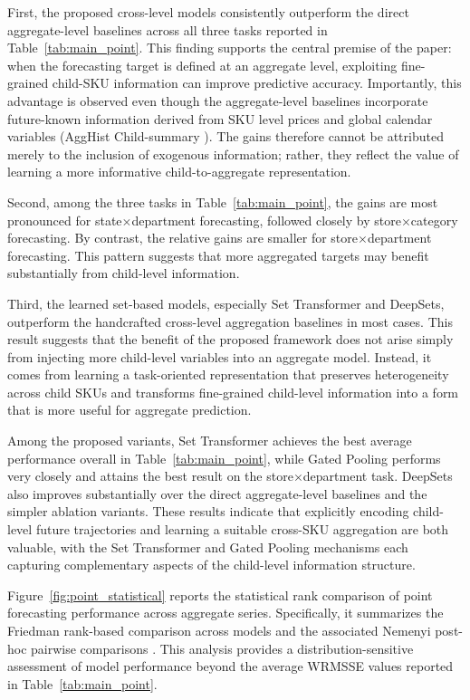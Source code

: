 \documentclass[12pt]{article}
\begin{document}
First, the proposed cross-level models consistently outperform the direct aggregate-level baselines across all three tasks reported in Table~\ref{tab:main_point}. This finding supports the central premise of the paper: when the forecasting target is defined at an aggregate level, exploiting fine-grained child-SKU information can improve predictive accuracy. Importantly, this advantage is observed even though the aggregate-level baselines incorporate future-known information derived from SKU level prices and global calendar variables (AggHist Child-summary ). The gains therefore cannot be attributed merely to the inclusion of exogenous information; rather, they reflect the value of learning a more informative child-to-aggregate representation.

Second, among the three tasks in Table~\ref{tab:main_point}, the gains are most pronounced for state$\times$department forecasting, followed closely by store$\times$category forecasting. By contrast, the relative gains are smaller for store$\times$department forecasting. This pattern suggests that more aggregated targets may benefit substantially from child-level information. 

Third, the learned set-based models, especially Set Transformer and DeepSets, outperform the handcrafted cross-level aggregation baselines in most cases. This result suggests that the benefit of the proposed framework does not arise simply from injecting more child-level variables into an aggregate model. Instead, it comes from learning a task-oriented representation that preserves heterogeneity across child SKUs and transforms fine-grained child-level information into a form that is more useful for aggregate prediction.

Among the proposed variants, Set Transformer achieves the best average performance overall in Table~\ref{tab:main_point}, while Gated Pooling performs very closely and attains the best result on the store$\times$department task. DeepSets also improves substantially over the direct aggregate-level baselines and the simpler ablation variants. These results indicate that explicitly encoding child-level future trajectories and learning a suitable cross-SKU aggregation are both valuable, with the Set Transformer and Gated Pooling mechanisms each capturing complementary aspects of the child-level information structure.

Figure~\ref{fig:point_statistical} reports the statistical rank comparison of point forecasting performance across aggregate series. Specifically, it summarizes the Friedman rank-based comparison across models and the associated Nemenyi post-hoc pairwise comparisons \parencite{nemenyi1963distributional,demsar2006statistical}. This analysis provides a distribution-sensitive assessment of model performance beyond the average WRMSSE values reported in Table~\ref{tab:main_point}.
\end{document}
